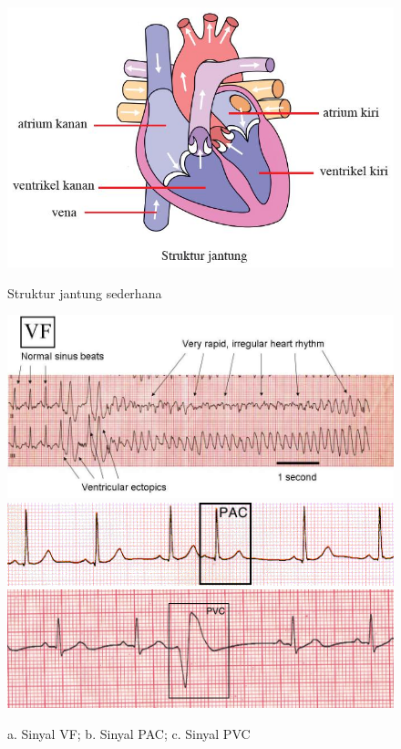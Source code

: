\begin{figure}[H]
    \centering
    \includegraphics[scale=0.4]{images/jantung.jpg}
    \caption{Struktur jantung sederhana}
	\includegraphics[scale=1.2]{images/VF.jpg}
    \includegraphics[scale=0.5]{images/PAC1.png}
	\includegraphics[scale=0.25]{images/PVC1.png}
    \caption{a. Sinyal VF; b. Sinyal PAC; c. Sinyal PVC}
    \label{fig:contoh_aritmia}	
\end{figure}


